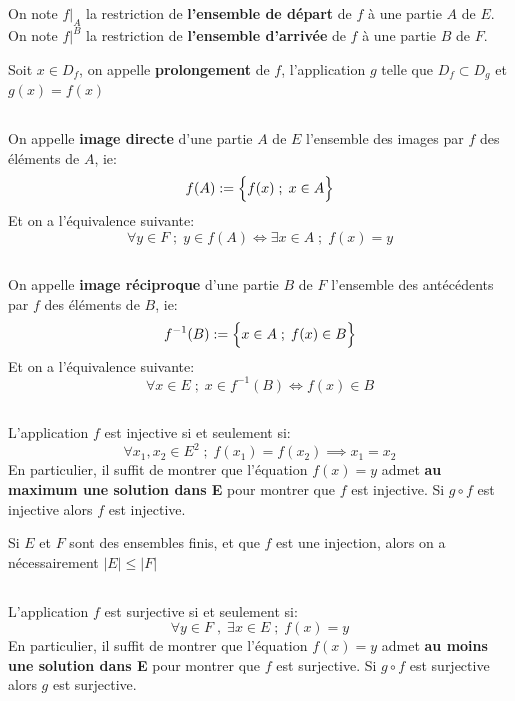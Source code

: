 \subsection*{}
On note \(f|_A\) la restriction de \textbf{l'ensemble de départ} de \(f\) à une partie \(A\) de \(E\).\+
On note \(f|^B\) la restriction de \textbf{l'ensemble d'arrivée} de \(f\) à une partie \(B\) de \(F\).\<

Soit \(x \in D_f\), on appelle \textbf{prolongement} de \(f\), l'application \(g\) telle que \(D_f \subset D_g\) et \(g(x) = f(x)\)
\subsection*{}
On appelle \textbf{image directe} d'une partie \(A\) de \(E\) l'ensemble des images par \(f\) des éléments de \(A\), ie:
\[
    f(A) := \Bigl\{ f(x) \; ; \; x \in A \Bigl\}   
\]
Et on a l'équivalence suivante:
\[
    \boxed{
       \forall y \in F \; ; \; y \in f(A) \Longleftrightarrow \exists x \in A \; ; \; f(x) = y
    }
\]
\subsection*{}
On appelle \textbf{image réciproque} d'une partie \(B\) de \(F\) l'ensemble des antécédents par \(f\) des éléments de \(B\), ie:
\[
    f^{-1}(B) := \Bigl\{ x \in A \; ; \; f(x) \in B \Bigl\}   
\]
Et on a l'équivalence suivante:
\[
    \boxed{
       \forall x \in E \; ; \; x \in f^{-1}(B) \Longleftrightarrow f(x) \in B
    }
\]
\subsection*{}
L'application \(f\) est injective si et seulement si:
\[
    \boxed{
        \forall x_1, x_2 \in E^2 \; ; \; f(x_1) = f(x_2) \implies x_1 = x_2 
    }
\]
En particulier, il suffit de montrer que l'équation \(f(x) = y\) admet \textbf{au maximum une solution dans E} pour montrer que \(f\) est injective.\+
Si \(g \circ f\) est injective alors \(f\) est injective.\<

Si \(E\) et \(F\) sont des ensembles finis, et que \(f\) est une injection, alors on a nécessairement \(|E| \leq |F|\)
\subsection*{}
L'application \(f\) est surjective si et seulement si:
\[
    \boxed{
        \forall y \in F \; , \; \exists x \in E \; ; \; f(x) = y  
    }
\]
En particulier, il suffit de montrer que l'équation \(f(x) = y\) admet \textbf{au moins une solution dans E} pour montrer que \(f\) est surjective.\+
Si \(g \circ f\) est surjective alors \(g\) est surjective.\<


